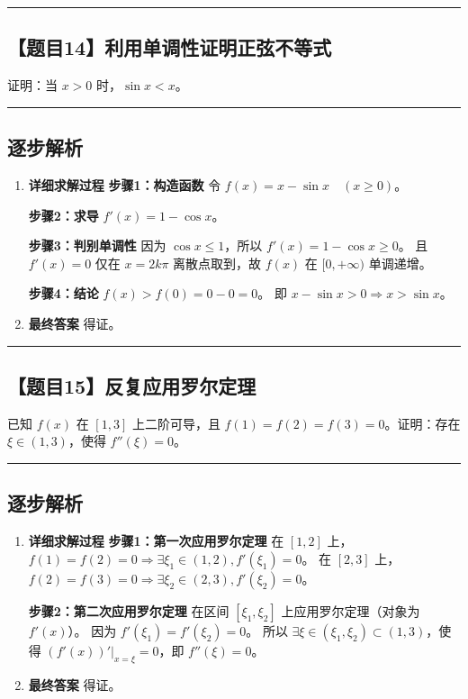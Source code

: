 \documentclass[UTF8]{ctexart}
\newenvironment{redenv}{\color{red}}{}
\newenvironment{detailedanalysis}{%
    \color{red}
    \begin{enumerate}[label=\textbf{第\arabic*步：}, leftmargin=*, align=left, itemsep=1.5ex]
}{%
    \end{enumerate}
}
\newcommand{\problemrule}{\noindent\rule{\textwidth}{1.5pt}\vspace{-0.8em}}
\newcommand{\analysisrule}{\noindent\rule{\textwidth}{0.8pt}\vspace{-0.8em}}
\begin{document}
\vspace{2em}
\problemrule
\subsection*{【题目14】利用单调性证明正弦不等式}
证明：当 $x > 0$ 时，$\sin x < x$。

\begin{redenv}
\analysisrule
\subsection*{逐步解析}

\begin{detailedanalysis}
\item \textbf{详细求解过程}
\noindent\textbf{步骤1：构造函数}
令 $f(x) = x - \sin x \quad (x \ge 0)$。

\noindent\textbf{步骤2：求导}
$f'(x) = 1 - \cos x$。

\noindent\textbf{步骤3：判别单调性}
因为 $\cos x \le 1$，所以 $f'(x) = 1 - \cos x \ge 0$。
且 $f'(x)=0$ 仅在 $x=2k\pi$ 离散点取到，故 $f(x)$ 在 $[0, +\infty)$ 单调递增。

\noindent\textbf{步骤4：结论}
$f(x) > f(0) = 0 - 0 = 0$。
即 $x - \sin x > 0 \Rightarrow x > \sin x$。

\item \textbf{最终答案}
得证。
\end{detailedanalysis}
\end{redenv}

\vspace{2em}
\problemrule
\subsection*{【题目15】反复应用罗尔定理}
已知 $f(x)$ 在 $[1, 3]$ 上二阶可导，且 $f(1)=f(2)=f(3)=0$。证明：存在 $\xi \in (1, 3)$，使得 $f''(\xi)=0$。

\begin{redenv}
\analysisrule
\subsection*{逐步解析}

\begin{detailedanalysis}
\item \textbf{详细求解过程}
\noindent\textbf{步骤1：第一次应用罗尔定理}
在 $[1, 2]$ 上，$f(1)=f(2)=0 \Rightarrow \exists \xi_1 \in (1, 2), f'(\xi_1)=0$。
在 $[2, 3]$ 上，$f(2)=f(3)=0 \Rightarrow \exists \xi_2 \in (2, 3), f'(\xi_2)=0$。

\noindent\textbf{步骤2：第二次应用罗尔定理}
在区间 $[\xi_1, \xi_2]$ 上应用罗尔定理（对象为 $f'(x)$）。
因为 $f'(\xi_1) = f'(\xi_2) = 0$。
所以 $\exists \xi \in (\xi_1, \xi_2) \subset (1, 3)$，使得 $(f'(x))'|_{x=\xi} = 0$，即 $f''(\xi) = 0$。

\item \textbf{最终答案}
得证。
\end{detailedanalysis}
\end{redenv}
\end{document}
